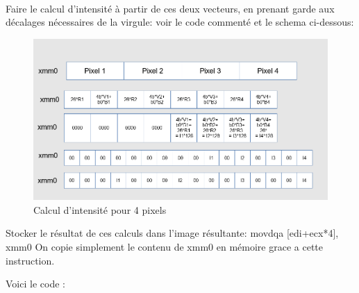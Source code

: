 \documentclass[11pt]{report}
\begin{document}
\\Faire le calcul d’intensité à partir de ces deux vecteurs, en prenant garde aux décalages
nécessaires de la virgule: voir le code commenté et le schema ci-dessous:
\begin{figure}[h]
\includegraphics[width=13cm]{Capture2.png}
\caption{Calcul d'intensité pour 4 pixels}
\end{figure}

Stocker le résultat de ces calculs dans l’image résultante:
movdqa [edi+ecx*4], xmm0
On copie simplement le contenu de xmm0 en mémoire grace a cette instruction.


\newpage
Voici le code :
\end{document}
